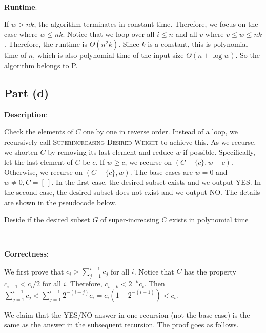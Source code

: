 \documentclass{article}
\begin{document}
~

\noindent\textbf{Runtime}:

If $w>nk$, the algorithm terminates in constant time. Therefore, we focus on the case where $w\leqslant nk$. Notice that we loop over all $i\leqslant n$ and all $v$ where $v\leqslant w\leqslant nk$. Therefore, the runtime is $\Theta(n^2k)$. Since $k$ is a constant, this is polynomial time of $n$, which is also polynomial time of the input size $\Theta(n+\log w)$. So the algorithm belongs to P.

\subsection{Part (d)}
\noindent\textbf{Description}:

Check the elements of $C$ one by one in reverse order. Instead of a loop, we recursively call \textsc{Superincreasing-Desired-Weight} to achieve this. As we recurse, we shorten $C$ by removing its last element and reduce $w$ if possible. Specifically, let the last element of $C$ be $c$. If $w\geqslant c$, we recurse on $(C-\{c\},w-c)$. Otherwise, we recurse on $(C-\{c\},w)$. The base cases are $w=0$ and $w\neq0,C=[~]$. In the first case, the desired subset exists and we output YES. In the second case, the desired subset does not exist and we output NO. The details are shown in the pseudocode below.

\begin{algorithm}
\caption{Deside if the desired subset $G$ of super-increasing $C$ exists in polynomial time}
\begin{algorithmic}[1]
 
 
\Else{}
	 {\Return{}}
	\Else{} {\Return{}}
	\EndIf
\EndIf
\EndProcedure
\end{algorithmic}
\end{algorithm}

~

\noindent\textbf{Correctness}:


We first prove that $c_i>\sum_{j=1}^{i-1}c_j$ for all $i$. Notice that $C$ has the property $c_{i-1}<c_i/2$ for all $i$. Therefore, $c_{i-k}<2^{-k}c_i$. Then $\sum_{j=1}^{i-1}c_j<\sum_{j=1}^{i-1}2^{-(i-j)}c_i=c_i(1-2^{-(i-1)})<c_i$.

We claim that the YES/NO answer in one recursion (not the base case) is the same as the answer in the subsequent recursion. The proof goes as follows.
\end{document}
